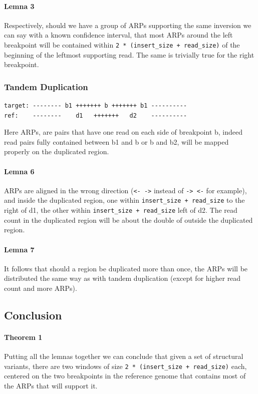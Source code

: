 \documentclass{article}
\begin{document}
\paragraph{Lemna 3} Respectively, should we have a group of ARPs supporting the same inversion we can say with a known confidence interval, that most ARPs around the left breakpoint will be contained within \verb|2 * (insert_size + read_size)| of the beginning of the leftmost supporting read. The same is trivially true for the right breakpoint.

\subsubsection{Tandem Duplication}

\begin{verbatim}
target: -------- b1 +++++++ b +++++++ b1 ----------
ref:    --------    d1   +++++++   d2    ----------
\end{verbatim}

Here ARPs, are pairs that have one read on each side of breakpoint b, indeed
read pairs fully contained between b1 and b or b and b2, will be mapped properly on the
duplicated region.

\paragraph{Lemna 6} ARPs are aligned in the wrong direction (\verb|<- ->| instead of \verb|-> <-| for example), and inside the duplicated region, one within \verb|insert_size + read_size| to the right of d1, the other within \verb|insert_size + read_size| left of d2.
The read count in the duplicated region will be about the double of outside the duplicated region.

\paragraph{Lemna 7} It follows that should a region be duplicated more than once, the ARPs will be distributed the same way as with tandem duplication (except for higher read count and more ARPs).

\subsection{Conclusion}

\paragraph{Theorem 1} Putting all the lemnas together we can conclude that given a set of structural variants, there are two windows of size \verb|2 * (insert_size + read_size)| each, centered on the two breakpoints in the reference genome that contains most of the ARPs that will support it.
\end{document}
